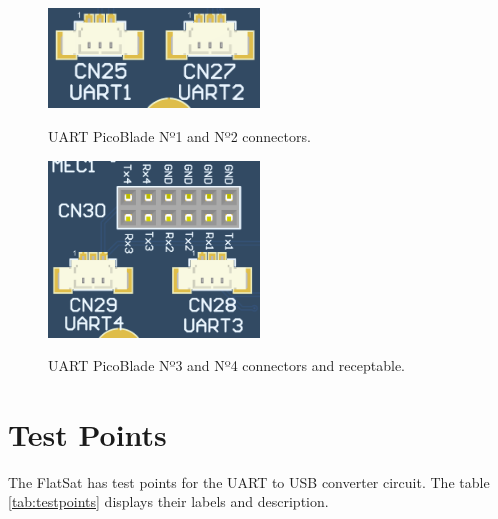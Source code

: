 \begin{figure}[!ht]
    \begin{center}
        \includegraphics[width=0.5\textwidth]{figures/picoblade_uarts_n1_and_n2}
        \caption{UART PicoBlade Nº1 and Nº2 connectors.}
        \label{fig:uart-picoblades-1}
        \includegraphics[width=0.5\textwidth]{figures/picoblade_uarts_n3_and_n4_and_receptable.png}
        \caption{UART PicoBlade Nº3 and Nº4 connectors and receptable.}
        \label{fig:uart-picoblades-2}
    \end{center}
\end{figure}

\section{Test Points}

The FlatSat has test points for the UART to USB converter circuit. The table \ref{tab:testpoints} displays their labels and description.

